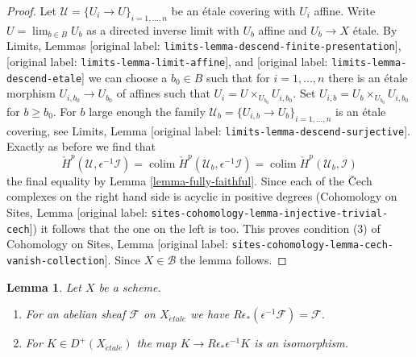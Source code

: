 \documentclass[10pt,a4paper]{article}
\theoremstyle{plain}
\newtheorem{lemma}[subsection]{Lemma}
\theoremstyle{definition}
\theoremstyle{remark}
\numberwithin{equation}{subsection}
\def\lim{\mathop{\mathrm{lim}}\nolimits}
\def\colim{\mathop{\mathrm{colim}}\nolimits}
\def\etale{{\acute{e}tale}}
\begin{document}
\begin{proof}
\medskip\noindent
Let $\mathcal{U} = \{U_i \to U\}_{i = 1, \ldots, n}$ be an \'etale covering
with $U_i$ affine. Write $U = \lim_{b \in B} U_b$ as a directed inverse limit
with $U_b$ affine and $U_b \to X$ \'etale.
By Limits, Lemmas [original label: \nolinkurl{limits-lemma-descend-finite-presentation}],
[original label: \nolinkurl{limits-lemma-limit-affine}], and
[original label: \nolinkurl{limits-lemma-descend-etale}]
we can choose a $b_0 \in B$ such that for $i = 1, \ldots, n$ there is an
\'etale morphism $U_{i, b_0} \to U_{b_0}$ of affines
such that $U_i = U \times_{U_{b_0}} U_{i, b_0}$.
Set $U_{i, b} = U_b \times_{U_{b_0}} U_{i, b_0}$ for $b \geq b_0$.
For $b$ large enough the family
$\mathcal{U}_b = \{U_{i, b} \to U_b\}_{i = 1, \ldots, n}$
is an \'etale covering, see
Limits, Lemma [original label: \nolinkurl{limits-lemma-descend-surjective}].
Exactly as before we find that
$$
\check{H}^p(\mathcal{U}, \epsilon^{-1}\mathcal{I}) =
\colim \check{H}^p(\mathcal{U}_b, \epsilon^{-1}\mathcal{I}) =
\colim \check{H}^p(\mathcal{U}_b, \mathcal{I})
$$
the final equality by Lemma \ref{lemma-fully-faithful}.
Since each of the {\v C}ech complexes on the right hand side is
acyclic in positive degrees
(Cohomology on Sites, Lemma
[original label: \nolinkurl{sites-cohomology-lemma-injective-trivial-cech}])
it follows that the one on the left is too. This proves condition (3) of
Cohomology on Sites, Lemma [original label: \nolinkurl{sites-cohomology-lemma-cech-vanish-collection}].
Since $X \in \mathcal{B}$ the lemma follows.
\end{proof}

\begin{lemma}
\label{lemma-relative-comparison}
Let $X$ be a scheme.
\begin{enumerate}
\item For an abelian sheaf $\mathcal{F}$ on $X_\etale$
we have $R\epsilon_*(\epsilon^{-1}\mathcal{F}) = \mathcal{F}$.
\item For $K \in D^+(X_\etale)$ the map $K \to R\epsilon_*\epsilon^{-1}K$
is an isomorphism.
\end{enumerate}
\end{lemma}
\end{document}
